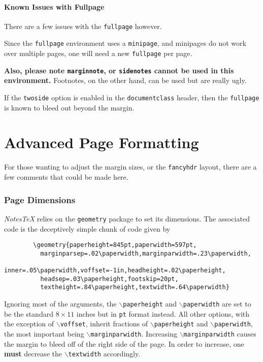 \documentclass[10pt]{article}
\begin{document}
	\subsection{Known Issues with Fullpage}\label{Sub: Fullpage_Issues}

	There are a few issues with the \texttt{fullpage} however. 
	\begin{remark}
		Since the \texttt{fullpage} environment uses a \texttt{minipage}, and minipages do not work over multiple pages, one will need a new \texttt{fullpage} per page.	
	\end{remark}
	\begin{remark}
		\textbf{Also, please note \texttt{marginnote}, or \texttt{sidenotes} cannot be used in this environment.} Footnotes, on the other hand, can be used but are really ugly.
	\end{remark}
	\begin{remark}
		If the \texttt{twoside} option is enabled in the \texttt{documentclass} header, then the \texttt{fullpage} is known to bleed out beyond the margin.
	\end{remark}
	\newpage

	\part{Advanced Page Formatting}
	For those wanting to adjust the margin sizes, or the \texttt{fancyhdr} layout, there are a few comments that could be made here.
	\section{Page Dimensions}
	\textit{NotesTeX} relies on the \texttt{geometry} package to set its dimensions. The associated code is the deceptively simple chunk of code given by
	\begin{verbatim}
		\geometry{paperheight=845pt,paperwidth=597pt,
          marginparsep=.02\paperwidth,marginparwidth=.23\paperwidth,
          inner=.05\paperwidth,voffset=-1in,headheight=.02\paperheight,
          headsep=.03\paperheight,footskip=20pt,
          textheight=.84\paperheight,textwidth=.64\paperwidth}
	\end{verbatim}
	Ignoring most of the arguments, the \texttt{$\backslash$paperheight} and \texttt{$\backslash$paperwidth} are set to be the standard $8\times11$ inches but in \texttt{pt} format instead. All other options, with the exception of \texttt{$\backslash$voffset}, inherit fractions of \texttt{$\backslash$paperheight} and \texttt{$\backslash$paperwidth}, the most important being \texttt{$\backslash$marginparwidth}. Increasing \texttt{$\backslash$marginparwidth} causes the margin to bleed off of the right side of the page. In order to increase, one \textbf{must} decrease the \texttt{$\backslash$textwidth} accordingly.
\end{document}
